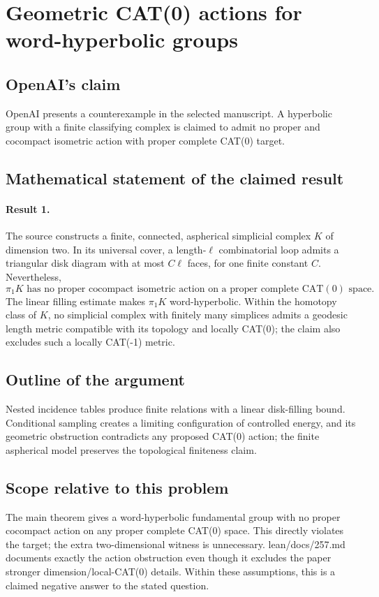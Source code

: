 \documentclass[11pt]{article}
\begin{document}
\section*{Geometric CAT(0) actions for word-hyperbolic groups}

\subsection{OpenAI's claim}
OpenAI presents a counterexample in the selected manuscript. A hyperbolic group with a finite classifying complex is claimed to admit no proper and cocompact isometric action with proper complete CAT(0) target.

\subsection{Mathematical statement of the claimed result}
\paragraph{Result 1.} The source constructs a finite, connected, aspherical simplicial complex \(K\) of dimension two. In its universal cover, a length-\(\ell\) combinatorial loop admits a triangular disk diagram with at most \(C\ell\) faces, for one finite constant \(C\). Nevertheless,
\[
 \pi_1K\text{ has no proper cocompact isometric action on a proper complete CAT}(0)\text{ space}.
\]
The linear filling estimate makes \(\pi_1K\) word-hyperbolic. Within the homotopy class of \(K\), no simplicial complex with finitely many simplices admits a geodesic length metric compatible with its topology and locally CAT(0); the claim also excludes such a locally CAT(-1) metric.

\subsection{Outline of the argument}
Nested incidence tables produce finite relations with a linear disk-filling bound. Conditional sampling creates a limiting configuration of controlled energy, and its geometric obstruction contradicts any proposed CAT(0) action; the finite aspherical model preserves the topological finiteness claim.

\subsection{Scope relative to this problem}
The main theorem gives a word-hyperbolic fundamental group with no proper cocompact action on any proper complete CAT(0) space. This directly violates the target; the extra two-dimensional witness is unnecessary. lean/docs/257.md documents exactly the action obstruction even though it excludes the paper stronger dimension/local-CAT(0) details. Within these assumptions, this is a claimed negative answer to the stated question.
\end{document}
